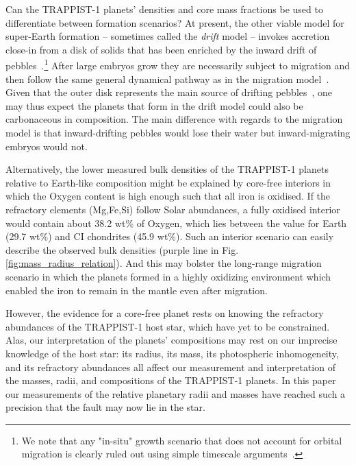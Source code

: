 \documentclass[fleqn,usenatbib]{mnras} %
\begin{document}
Can the TRAPPIST-1 planets' densities and core mass fractions be used to differentiate between formation scenarios? At present, the other viable model for super-Earth formation -- sometimes called the {\em drift} model -- invokes accretion close-in from a disk of solids that has been enriched by the inward drift of pebbles~\citep{chatterjee14,chatterjee15,dawson15}.\footnote{We note that any "in-situ" growth scenario that does not account for orbital migration is clearly ruled out using simple timescale arguments~\citep[i.e., because migration -- and even aerodynamic drift -- is far too fast to ignore; see][]{ogihara15,inamdar15,izidoro2018}.} After large embryos grow they are necessarily subject to migration and then follow the same general dynamical pathway as in the migration model~\citep[involving resonant capture and later breaking of resonant chains; see discussion in][]{raymond18d}. Given that the outer disk represents the main source of drifting pebbles~\citep{lambrechts14,ida16}, one may thus expect the planets that form in the drift model could also be carbonaceous in composition. The main difference with regards to the migration model is that inward-drifting pebbles would lose their water but inward-migrating embryos would not. %

Alternatively, the lower measured bulk densities of the TRAPPIST-1 planets relative to Earth-like composition might be explained by core-free interiors \citep{ElkinsTanton2008} in which the Oxygen content is high enough such that all iron is oxidised. If the refractory elements (Mg,Fe,Si) follow Solar abundances, a fully oxidised interior would contain about 38.2 wt\% of Oxygen, which lies between the value for Earth (29.7 wt\%) and CI chondrites (45.9 wt\%). Such an interior scenario can easily describe the observed bulk densities (purple line in Fig. \ref{fig:mass_radius_relation}).  And this may bolster the long-range migration scenario in which the planets formed in a highly oxidizing environment which enabled the iron to remain in the mantle even after migration.  

However, the evidence for a core-free planet rests on knowing the refractory abundances of the TRAPPIST-1 host star, which have yet to be constrained.  Alas, our interpretation of the planets' compositions may rest on our imprecise knowledge of the host star:  its radius, its mass, its photospheric inhomogeneity, and its refractory abundances all affect our measurement and interpretation of the masses, radii, and compositions of the TRAPPIST-1 planets.  In this paper our measurements of the relative planetary radii and masses have reached such a precision that the fault may now lie in the star.
\end{document}
